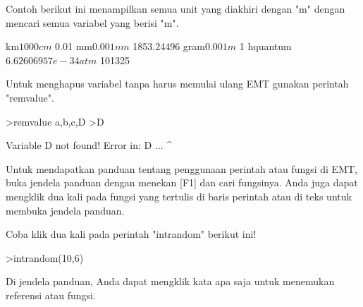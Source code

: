 \documentclass[a4paper,10pt]{article}
\begin{document}
\begin{eulernotebook}
\begin{eulercomment}
\begin{eulercomment}
\begin{eulercomment}
\begin{eulercomment}
\begin{eulercomment}
Contoh berikut ini menampilkan semua unit yang diakhiri dengan "m"
dengan mencari semua variabel yang berisi "m\textdollar{}".
\end{eulercomment}
\begin{euleroutput}
  km$                 1000
  cm$                 0.01
  mm$                 0.001
  nm$                 1853.24496
  gram$               0.001
  m$                  1
  hquantum$           6.62606957e-34
  atm$                101325
\end{euleroutput}
\begin{eulercomment}
Untuk menghapus variabel tanpa harus memulai ulang EMT gunakan
perintah "remvalue".
\end{eulercomment}
\begin{eulerprompt}
>remvalue a,b,c,D
>D
\end{eulerprompt}
\begin{euleroutput}
  Variable D not found!
  Error in:
  D ...
   ^
\end{euleroutput}
\begin{eulercomment}
Untuk mendapatkan panduan tentang penggunaan perintah atau fungsi di EMT, buka
jendela panduan dengan menekan [F1] dan cari fungsinya. Anda juga dapat
mengklik dua kali pada fungsi yang tertulis di baris perintah atau di teks
untuk membuka jendela panduan.

Coba klik dua kali pada perintah "intrandom" berikut ini!
\end{eulercomment}
\begin{eulerprompt}
>intrandom(10,6)
\end{eulerprompt}
\begin{euleroutput}
  [4,  2,  6,  2,  4,  2,  3,  2,  2,  6]
\end{euleroutput}
\begin{eulercomment}
Di jendela panduan, Anda dapat mengklik kata apa saja untuk menemukan
referensi atau fungsi.


\end{eulercomment}
\end{eulercomment}
\end{eulercomment}
\end{eulercomment}
\end{eulercomment}
\end{eulernotebook}
\end{document}

